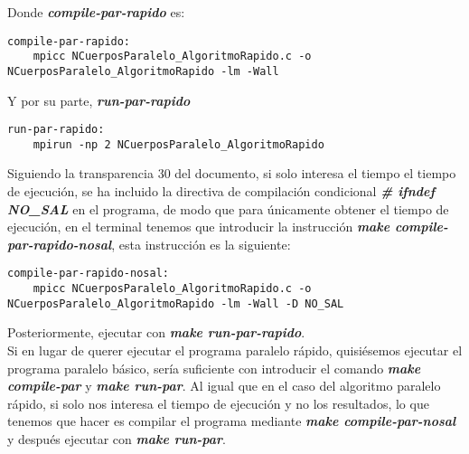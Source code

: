 \documentclass[11pt]{article}
\begin{document}
Donde \textbf{\textit{compile-par-rapido}} es:

\begin{lstlisting}[style=C, numbers=none]
compile-par-rapido:
	mpicc NCuerposParalelo_AlgoritmoRapido.c -o NCuerposParalelo_AlgoritmoRapido -lm -Wall
\end{lstlisting}

Y por su parte, \textbf{\textit{run-par-rapido}}
\begin{lstlisting}[style=C,numbers=none]
run-par-rapido:
	mpirun -np 2 NCuerposParalelo_AlgoritmoRapido
\end{lstlisting}


Siguiendo la transparencia 30 del documento, si solo interesa el tiempo el tiempo de ejecución, se ha incluido la directiva de compilación condicional \textbf{\textit{\# ifndef NO\_SAL}} en el programa, de modo que para únicamente obtener el tiempo de ejecución, en el terminal tenemos que introducir la instrucción \textbf{\textit{make compile-par-rapido-nosal}}, esta instrucción es la siguiente:

\begin{lstlisting}[style=C,numbers=none]
compile-par-rapido-nosal:
	mpicc NCuerposParalelo_AlgoritmoRapido.c -o NCuerposParalelo_AlgoritmoRapido -lm -Wall -D NO_SAL
\end{lstlisting}

Posteriormente, ejecutar con \textbf{\textit{make run-par-rapido}}.\\ 

Si en lugar de querer ejecutar el programa paralelo rápido, quisiésemos ejecutar el programa paralelo básico, sería suficiente con introducir el comando \textbf{\textit{make compile-par}} y \textbf{\textit{make run-par}}. Al igual que en el caso del algoritmo paralelo rápido, si solo nos interesa el tiempo de ejecución y no los resultados, lo que tenemos que hacer es compilar el programa mediante \textbf{\textit{make compile-par-nosal}} y después ejecutar con \textbf{\textit{make run-par}}.
\end{document}
